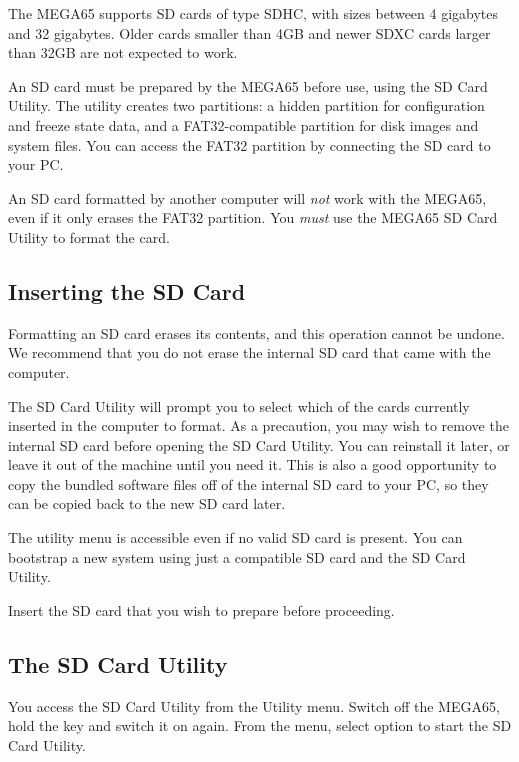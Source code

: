 The MEGA65 supports SD cards of type SDHC, with sizes between 4 gigabytes and 32 gigabytes. Older cards smaller than 4GB and newer SDXC cards larger than 32GB are not expected to work.

An SD card must be prepared by the MEGA65 before use, using the SD Card Utility. The utility creates two partitions: a hidden partition for configuration and freeze state data, and a FAT32-compatible partition for disk images and system files. You can access the FAT32 partition by connecting the SD card to your PC.

An SD card formatted by another computer will {\em not} work with the MEGA65, even if it only erases the FAT32 partition. You {\em must} use the MEGA65 SD Card Utility to format the card.

\subsection{Inserting the SD Card}

Formatting an SD card erases its contents, and this operation cannot be undone. We recommend that you do not erase the internal SD card that came with the computer.

The SD Card Utility will prompt you to select which of the cards currently inserted in the computer to format. As a precaution, you may wish to remove the internal SD card before opening the SD Card Utility. You can reinstall it later, or leave it out of the machine until you need it. This is also a good opportunity to copy the bundled software files off of the internal SD card to your PC, so they can be copied back to the new SD card later.

The utility menu is accessible even if no valid SD card is present. You can bootstrap a new system using just a compatible SD card and the SD Card Utility.

Insert the SD card that you wish to prepare before proceeding.

\subsection{The SD Card Utility}

You access the SD Card Utility from the Utility menu. Switch off the MEGA65, hold the  key and switch it on again. From the menu, select option  to start the SD Card Utility.

